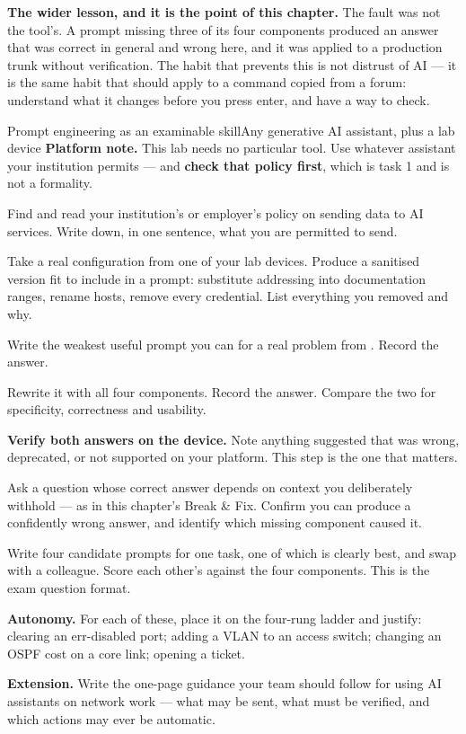 \begin{breakfix}
\textbf{The wider lesson, and it is the point of this chapter.} The fault was not
the tool's. A prompt missing three of its four components produced an answer that
was correct in general and wrong here, and it was applied to a production trunk
without verification. The habit that prevents this is not distrust of AI --- it
is the same habit that should apply to a command copied from a forum: understand
what it changes before you press enter, and have a way to check.
\end{breakfix}

\begin{lab}{Prompt engineering as an examinable skill}{Any generative AI assistant, plus a lab device}
\textbf{Platform note.} This lab needs no particular tool. Use whatever assistant
your institution permits --- and \textbf{check that policy first}, which is task
1 and is not a formality.

\begin{tasks}
  \item Find and read your institution's or employer's policy on sending data to
        AI services. Write down, in one sentence, what you are permitted to send.
  \item Take a real configuration from one of your lab devices. Produce a
        sanitised version fit to include in a prompt: substitute addressing into
        documentation ranges, rename hosts, remove every credential. List
        everything you removed and why.
  \item Write the weakest useful prompt you can for a real problem from
        . Record the answer.
  \item Rewrite it with all four components. Record the answer. Compare the two
        for specificity, correctness and usability.
  \item \textbf{Verify both answers on the device.} Note anything suggested that
        was wrong, deprecated, or not supported on your platform. This step is
        the one that matters.
  \item Ask a question whose correct answer depends on context you deliberately
        withhold --- as in this chapter's Break \& Fix. Confirm you can produce a
        confidently wrong answer, and identify which missing component caused it.
  \item Write four candidate prompts for one task, one of which is clearly best,
        and swap with a colleague. Score each other's against the four
        components. This is the exam question format.
  \item \textbf{Autonomy.} For each of these, place it on the four-rung ladder
        and justify: clearing an err-disabled port; adding a VLAN to an access
        switch; changing an OSPF cost on a core link; opening a ticket.
  \item \textbf{Extension.} Write the one-page guidance your team should follow
        for using AI assistants on network work --- what may be sent, what must
        be verified, and which actions may ever be automatic.
\end{tasks}
\end{lab}

